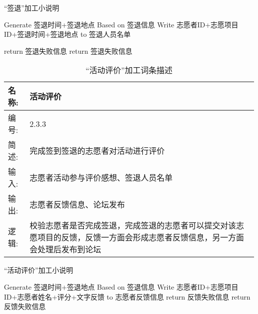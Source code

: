 \begin{algorithm}[H]
    \renewcommand{\thealgorithm}{}
    \caption{``签退”加工小说明} 
    \label{alg3} 
    \begin{algorithmic}[1]
        \STATE Generate 签退时间+签退地点 Based on 签退信息
        \STATE Write 志愿者ID+志愿项目ID+签退时间+签退地点 to 签退人员名单
        
        \ELSE return 签退失败信息
        \ENDIF
        \ELSE return 签退失败信息
        \ENDIF
    \end{algorithmic} 
\end{algorithm}


\begin{table}[H]  
\caption{``活动评价”加工词条描述}  
\begin{center}  
    \begin{tabular}{l p{11cm}} 
        \hline
        \quad 名称: & 活动评价\\
        \hline
        \quad 编号: & 2.3.3 \\
        \hline
        \quad 简述: & 完成签到签退的志愿者对活动进行评价 \\
        \hline
        \quad 输入:& 志愿者活动参与评价感想、签退人员名单 \\
        \hline
        \quad 输出:& 志愿者反馈信息、论坛发布\\
        \hline
        \quad 逻辑:& 校验志愿者是否完成签退，完成签退的志愿者可以提交对该志愿项目的反馈，反馈一方面会形成志愿者反馈信息，另一方面会处理后发布到论坛 \\
        \hline
    \end{tabular}
    \label{tab1}
\end{center}
\end{table}

\begin{algorithm}[H]
    \renewcommand{\thealgorithm}{}
    \caption{``活动评价”加工小说明} 
    \label{alg3} 
    \begin{algorithmic}[1]
        \STATE Generate 签退时间+签退地点 Based on 签退信息
        \STATE Write 志愿者ID+志愿项目ID+志愿者姓名+评分+文字反馈 to 志愿者反馈信息
        \ELSE return 反馈失败信息
        \ENDIF
        \ELSE return 反馈失败信息
        \ENDIF
    \end{algorithmic} 
\end{algorithm}


